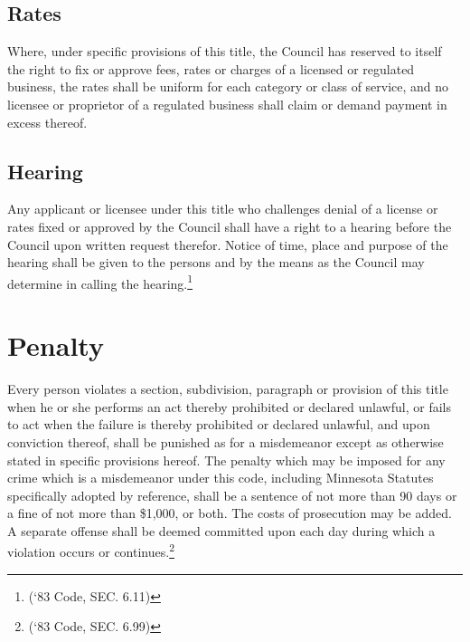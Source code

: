 \subsection{Rates}
Where, under specific provisions of this title, the Council has reserved to itself the right to fix or approve fees, rates or charges of a licensed or regulated business, the rates shall be uniform for each category or class of service, and no licensee or proprietor of a regulated business shall claim or demand payment in excess thereof.
\subsection{Hearing}
Any applicant or licensee under this title who challenges denial of a license or rates fixed or approved by the Council shall have a right to a hearing before the Council upon written request therefor.  Notice of time, place and purpose of the hearing shall be given to the persons and by the means as the Council may determine in calling the hearing.\footnote{(‘83 Code, SEC. 6.11)}

\setcounter{section}{98}
\section{Penalty}
Every person violates a section, subdivision, paragraph or provision of this title when he or she performs an act thereby prohibited or declared unlawful, or fails to act when the failure is thereby prohibited or declared unlawful, and upon conviction thereof, shall be punished as for a misdemeanor except as otherwise stated in specific provisions hereof.  The penalty which may be imposed for any crime which is a misdemeanor under this code, including Minnesota Statutes specifically adopted by reference, shall be a sentence of not more than 90 days or a fine of not more than \$1,000, or both.  The costs of prosecution may be added.  A separate offense shall be deemed committed upon each day during which a violation occurs or continues.\footnote{(‘83 Code, SEC. 6.99)}
